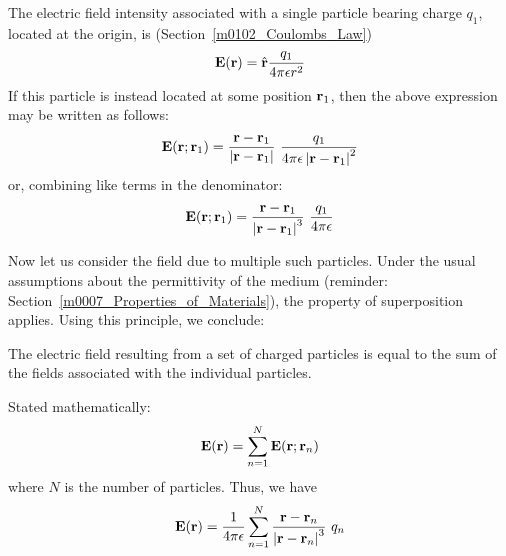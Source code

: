 

\label{m0103_E_due_to_Point_Charges} %

The electric field intensity associated with a single particle bearing charge $q_1$, located at the origin, is (Section~\ref{m0102_Coulombs_Law})
%
\begin{equation}
{\bf E}({\bf r}) = \hat{\bf r}\frac{q_1}{4\pi\epsilon r^2}
\end{equation} 
%
If this particle is instead located at some position ${\bf r}_1$, then the above expression may be written as follows:
%
\begin{equation}
{\bf E}({\bf r};{\bf r}_1) = \frac{{\bf r}-{\bf r}_1}{\left|{\bf r}-{\bf r}_1\right|}~\frac{q_1}{4\pi\epsilon \left|{\bf r}-{\bf r}_1\right|^2}
\end{equation} 
%
or, combining like terms in the denominator:
%
\begin{equation}
{\bf E}({\bf r};{\bf r}_1) = \frac{{\bf r}-{\bf r}_1}{\left|{\bf r}-{\bf r}_1\right|^3}~\frac{q_1}{4\pi\epsilon}
\end{equation} 

Now let us consider the field due to multiple such particles.
Under the usual assumptions about the permittivity of the medium (reminder: Section~\ref{m0007_Properties_of_Materials}), the property of superposition applies.
Using this principle, we conclude: 
%
\begin{mdframed}[backgroundcolor=yellow!20,nobreak=true] 
The electric field resulting from a set of charged particles is equal to the sum of the fields associated with the individual particles.
\end{mdframed}
%
Stated mathematically:
%
\begin{equation}
{\bf E}({\bf r}) = \sum_{n=1}^{N}{\bf E}({\bf r};{\bf r}_n)
\end{equation} 
%
where $N$ is the number of particles.
Thus, we have
%
\begin{equation}
{\bf E}({\bf r}) = \frac{1}{4\pi\epsilon} \sum_{n=1}^{N} {   \frac{{\bf r}-{\bf r}_n}{\left|{\bf r}-{\bf r}_n\right|^3}~q_n}
\end{equation} 






